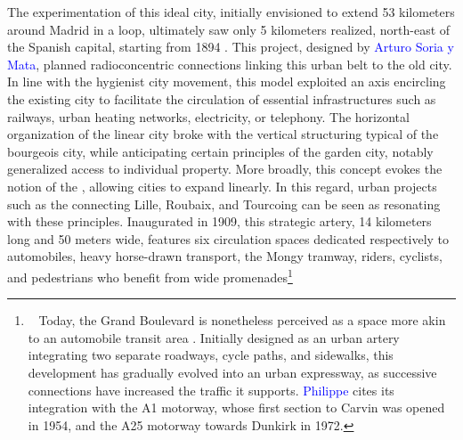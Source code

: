 \begin{refsegment}
The experimentation of this ideal city, initially envisioned to extend 53 kilometers around Madrid in a loop, ultimately saw only 5 kilometers realized, north-east of the Spanish capital, starting from 1894 \textcolor{blue}{\autocite[722]{furundzic_infrastructure_2012}}. This project, designed by \textcolor{blue}{Arturo Soria y Mata}, planned radioconcentric connections linking this urban belt to the old city. In line with the hygienist city movement, this model exploited an axis encircling the existing city to facilitate the circulation of essential infrastructures such as railways, urban heating networks, electricity, or telephony. The horizontal organization of the linear city broke with the vertical structuring typical of the bourgeois city, while anticipating certain principles of the garden city, notably generalized access to individual property. More broadly, this concept evokes the notion of the  \textcolor{blue}{\autocite[63]{liu_corridors_2016}}, allowing cities to expand linearly. In this regard, urban projects such as the  connecting Lille, Roubaix, and Tourcoing can be seen as resonating with these principles. Inaugurated in 1909, this strategic artery, 14 kilometers long and 50 meters wide, features six circulation spaces dedicated respectively to automobiles, heavy horse-drawn transport, the Mongy tramway, riders, cyclists, and pedestrians who benefit from wide promenades\footnote{~
    Today, the Grand Boulevard is nonetheless perceived as a space more akin to an automobile transit area \textcolor{blue}{\autocite[139]{maitre_ambivalence_2016}}. Initially designed as an urban artery integrating two separate roadways, cycle paths, and sidewalks, this development has gradually evolved into an urban expressway, as successive connections have increased the traffic it supports. \textcolor{blue}{Philippe} \textcolor{blue}{\textcite[155]{menerault_gares_2008}} cites its integration with the A1 motorway, whose first section to Carvin was opened in 1954, and the A25 motorway towards Dunkirk in 1972.
}
\end{refsegment}

